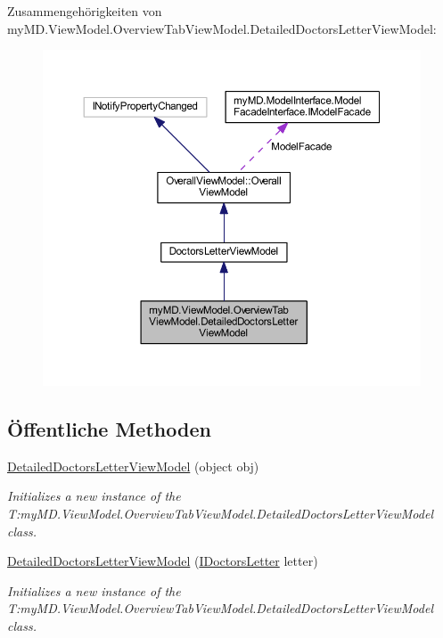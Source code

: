 Zusammengehörigkeiten von my\+M\+D.\+View\+Model.\+Overview\+Tab\+View\+Model.\+Detailed\+Doctors\+Letter\+View\+Model\+:\nopagebreak
\begin{figure}[H]
\begin{center}
\leavevmode
\includegraphics[width=350pt]{classmy_m_d_1_1_view_model_1_1_overview_tab_view_model_1_1_detailed_doctors_letter_view_model__coll__graph}
\end{center}
\end{figure}
\subsection*{Öffentliche Methoden}
\begin{DoxyCompactItemize}
\item 
\mbox{\hyperlink{classmy_m_d_1_1_view_model_1_1_overview_tab_view_model_1_1_detailed_doctors_letter_view_model_a344adddfaaa08415feb4e37a8d2428f5}{Detailed\+Doctors\+Letter\+View\+Model}} (object obj)
\begin{DoxyCompactList}\small\item\em Initializes a new instance of the T\+:my\+M\+D.\+View\+Model.\+Overview\+Tab\+View\+Model.\+Detailed\+Doctors\+Letter\+View\+Model class. \end{DoxyCompactList}\item 
\mbox{\hyperlink{classmy_m_d_1_1_view_model_1_1_overview_tab_view_model_1_1_detailed_doctors_letter_view_model_aa879528b83398ced704ca2be3b63bb3d}{Detailed\+Doctors\+Letter\+View\+Model}} (\mbox{\hyperlink{interfacemy_m_d_1_1_model_interface_1_1_data_model_interface_1_1_i_doctors_letter}{I\+Doctors\+Letter}} letter)
\begin{DoxyCompactList}\small\item\em Initializes a new instance of the T\+:my\+M\+D.\+View\+Model.\+Overview\+Tab\+View\+Model.\+Detailed\+Doctors\+Letter\+View\+Model class. \end{DoxyCompactList}\end{DoxyCompactItemize}
